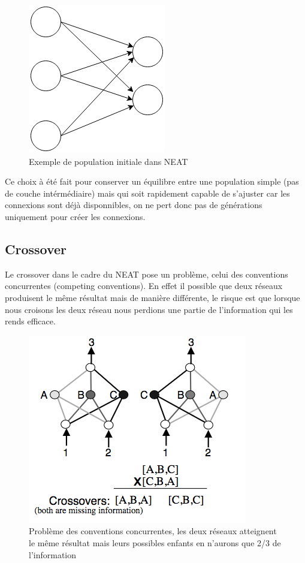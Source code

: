 \documentclass{article}
\begin{document}
\begin{figure}[h]
\begin{center}
	\includegraphics[scale=0.6]{initneat.png}
	\caption{Exemple de population initiale dans NEAT}
\end{center}
\end{figure}

Ce choix à été fait pour conserver un équilibre entre une population simple (pas de couche intérmédiaire) mais qui soit rapidement capable de s'ajuster car les connexions sont déjà disponnibles, on ne pert donc pas de générations uniquement pour créer les connexions.

\subsection{Crossover}

Le crossover dans le cadre du NEAT pose un problème, celui des conventions concurrentes (competing conventions). En effet il possible que deux réseaux produisent le même résultat mais de manière différente, le risque est que lorsque nous croisons les deux réseau nous perdions une partie de l'information qui les rends efficace.

\begin{figure}[h]
\begin{center}
	\includegraphics[scale=0.4]{competingconventions.png}
	\caption{Problème des conventions concurrentes, les deux réseaux atteignent le même résultat mais leurs possibles enfants en n'aurons que 2/3 de l'information \cite{neatpaper}}
\end{center}
\end{figure}
\end{document}
